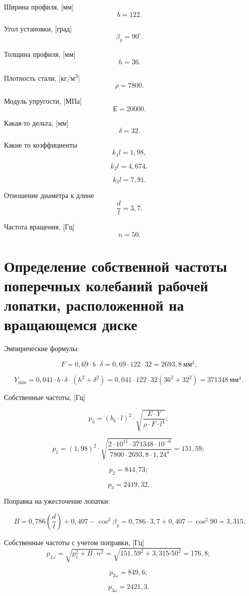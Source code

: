 Ширина профиля, [мм]
\[b = 122.\]

Угол установки, [град]
\[\beta_{y} = 90^\circ.\]

Толщина профиля, [мм]
\[h = 36.\]

Плотность стали, [кг/м\textsuperscript{3}]
\[\rho = 7800.\]

Модуль упругости, [МПа]
\[Е = 20000.\]

Какая-то дельта, [мм]
\[\delta = 32.\]

Какие то коэффициенты
\[k_{1}l = 1,98,\]

\[k_{2}l = 4,674,\]

\[k_{3}l = 7,91.\]

Отношение диаметра к длине
\[\frac{d}{l} = 3,7.\]

Частота вращения, [Гц]
\[n = 50.\]


\section{Определение собственной частоты поперечных колебаний рабочей лопатки,
  расположенной на вращающемся диске}


Эмпирические формулы:

\[F = 0,69\cdot b\cdot\delta = 0,69\cdot122\cdot32 = 2693,8\ {мм}^{2},\]

\[Y_{\min} = 0,041\cdot b\cdot\delta\cdot\left( h^{2} + \delta^{2} \right) = 0,041\cdot122\cdot32\left( 36^{2} + 32^{2} \right) = 371348\ {мм}^{4}.\ \]

Собственные частоты, [Гц]

\[p_{k} = \left( b_{k}\cdot l \right)^{2}\cdot\sqrt{\frac{{E\cdot Y}}{\rho\cdot F\cdot l^{4}}} ;\ \]

\[p_{1} = \left( 1,98 \right)^{2}\cdot\sqrt{\frac{2\cdot10^{11}\cdot371348\cdot10^{- 6}}{7800\cdot2693,8\cdot{1,24}^{4}}} = 151,59;\ \]

\[p_{2} = 844,73;\ \]

\[p_{3} = 2419,32.\ \]

Поправка на ужесточение лопатки:

\[\ B = 0,786\left( \frac{d}{l} \right) + 0,407 - \cos^{2}\beta_{y} = 0,786\cdot3,7 + 0,407 - \cos^{2}90 = 3,315,\]

Собственные частоты с учетом поправки, [Гц]
\[p_{1\omega} = \sqrt{p_{1}^{2} + B\cdot n^{2}} = \sqrt{{151,59}^{2} + 3,315{\cdot50}^{2}} = 176,8;\ \]

\[p_{2\omega} = 849,6;\ \]

\[p_{3\omega}= 2421,3.\ \]

